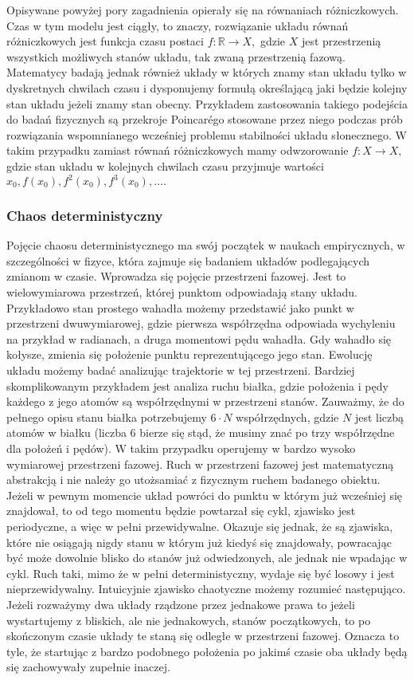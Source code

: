 \documentclass[licencjacka]{pwr_wmat_praca_dyplomowa}
\theoremstyle{plain}
\numberwithin{theorem}{chapter}
\theoremstyle{definition}
\numberwithin{theorem}{chapter}
\begin{document}
Opisywane powyżej pory zagadnienia opierały się na równaniach różniczkowych. Czas w tym modelu jest ciągły, to znaczy, rozwiązanie układu równań różniczkowych jest funkcja czasu postaci $f: \mathbb{R} \rightarrow X,$ gdzie $X$ jest przestrzenią wszystkich możliwych stanów układu, tak zwaną przestrzenią fazową. Matematycy badają jednak również układy w których znamy stan układu tylko w dyskretnych chwilach czasu i dysponujemy formułą określającą jaki będzie kolejny stan układu jeżeli znamy stan obecny. Przykładem zastosowania takiego podejścia do badań fizycznych są przekroje Poincar\'ego stosowane przez niego podczas prób rozwiązania wspomnianego wcześniej problemu stabilności układu słonecznego. W takim przypadku zamiast równań różniczkowych mamy odwzorowanie $f: X \rightarrow X,$ gdzie stan układu w kolejnych chwilach czasu przyjmuje wartości $x_0, f(x_0), f^2(x_0), f^3(x_0), \ldots.$





\subsubsection{Chaos deterministyczny}
Pojęcie chaosu deterministycznego ma swój początek w naukach empirycznych, w szczególności w fizyce, która zajmuje się badaniem układów podlegających zmianom w czasie. Wprowadza się pojęcie przestrzeni fazowej. Jest to wielowymiarowa przestrzeń, której punktom odpowiadają stany układu. Przykładowo stan prostego wahadła możemy przedstawić jako punkt w przestrzeni dwuwymiarowej, gdzie pierwsza współrzędna odpowiada wychyleniu na przykład w radianach, a druga momentowi pędu wahadła. Gdy wahadło się kołysze, zmienia się położenie punktu reprezentującego jego stan. Ewolucję układu możemy badać analizując trajektorie w tej przestrzeni. Bardziej skomplikowanym przykładem jest analiza ruchu białka, gdzie położenia i pędy każdego z jego atomów są współrzędnymi w przestrzeni stanów. Zauważmy, że do pełnego opisu stanu białka potrzebujemy $6 \cdot N$ współrzędnych, gdzie $N$ jest liczbą atomów w białku (liczba 6 bierze się stąd, że musimy znać po trzy współrzędne dla położeń i pędów). W takim przypadku operujemy w bardzo wysoko wymiarowej przestrzeni fazowej. Ruch w przestrzeni fazowej jest matematyczną abstrakcją i nie należy go utożsamiać z fizycznym ruchem badanego obiektu. Jeżeli w pewnym momencie układ powróci do punktu w którym już wcześniej się znajdował, to od tego momentu będzie powtarzał się cykl, zjawisko jest periodyczne, a więc w pełni przewidywalne. Okazuje się jednak, że są zjawiska, które nie osiągają nigdy stanu w którym już kiedyś się znajdowały, powracając być może dowolnie blisko do stanów już odwiedzonych, ale jednak nie wpadając w cykl. Ruch taki, mimo że w pełni deterministyczny, wydaje się być losowy i jest nieprzewidywalny. Intuicyjnie zjawisko chaotyczne możemy rozumieć następująco. Jeżeli rozważymy dwa układy rządzone przez jednakowe prawa to jeżeli wystartujemy z bliskich, ale nie jednakowych, stanów początkowych, to po skończonym czasie układy te staną się odległe w przestrzeni fazowej. Oznacza to tyle, że startując z bardzo podobnego położenia po jakimś czasie oba układy będą się zachowywały zupełnie inaczej.
\end{document}
